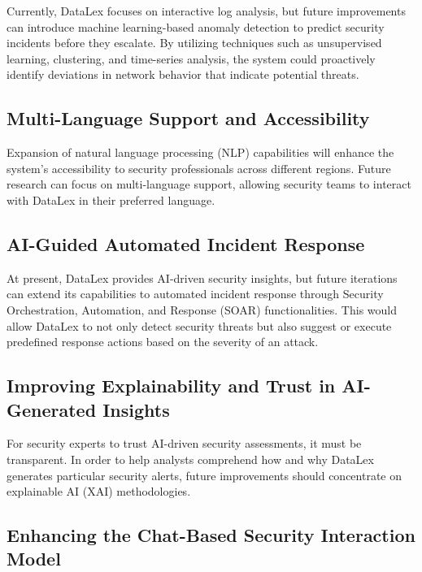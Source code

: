Currently, DataLex focuses on interactive log analysis, but future improvements can introduce machine learning-based anomaly detection to predict security incidents before they escalate. By utilizing techniques such as unsupervised learning, clustering, and time-series analysis, the system could proactively identify deviations in network behavior that indicate potential threats.

\subsection{Multi-Language Support and Accessibility}
\label{subsec_multi_language_support}

Expansion of natural language processing (NLP) capabilities will enhance the system's accessibility to security professionals across different regions. Future research can focus on multi-language support, allowing security teams to interact with DataLex in their preferred language.

\subsection{AI-Guided Automated Incident Response}
\label{subsec_ai_guided_incident_response}

At present, DataLex provides AI-driven security insights, but future iterations can extend its capabilities to automated incident response through Security Orchestration, Automation, and Response (SOAR) functionalities. This would allow DataLex to not only detect security threats but also suggest or execute predefined response actions based on the severity of an attack.

\subsection{Improving Explainability and Trust in AI-Generated Insights}
\label{subsec_improving_explainability}

For security experts to trust AI-driven security assessments, it must be transparent. In order to help analysts comprehend how and why DataLex generates particular security alerts, future improvements should concentrate on explainable AI (XAI) methodologies.

\subsection{Enhancing the Chat-Based Security Interaction Model}
\label{subsec_enhancing_chat_interaction}

